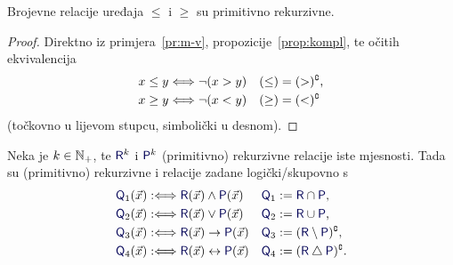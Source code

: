 \begin{korolar}\label{kor:mj-vj}
Brojevne relacije uređaja $\le$ i $\ge$ su primitivno rekurzivne.
\end{korolar}
\begin{proof}
Direktno iz primjera~\ref{pr:m-v}, propozicije~\ref{prop:kompl}, te očitih ekvivalencija
\begin{align}
    x\le y&\Longleftrightarrow\lnot(x>y) & (\le) &= (>)\sp{{\scriptscriptstyle\complement}}\text,\\
    x\ge y&\Longleftrightarrow\lnot(x<y) & (\ge) &= (<)\sp{{\scriptscriptstyle\complement}}
\end{align}
(točkovno u lijevom stupcu, simbolički u desnom).
\end{proof}

\begin{propozicija}\label{prop:vezn}
Neka je $k\in{\mathbb N}_+$, te $\f R^k$ i $\f P^k$ (primitivno) rekurzivne relacije iste mjesnosti. Tada su (primitivno) rekurzivne i relacije zadane logički\slash skupovno s
\begin{align}
    \f Q_1(\vec x)&:\Longleftrightarrow\f R(\vec x)\land\f P(\vec x)
    &
    \f Q_1 &:=\f R \cap\f P\text,
    \\
    \f Q_2(\vec x)&:\Longleftrightarrow\f R(\vec x)\lor\f P(\vec x)
    &
    \f Q_2 &:=\f R \cup\f P\text,
    \\
    \f Q_3(\vec x)&:\Longleftrightarrow\f R(\vec x)\to\f P(\vec x)
    &
    \f Q_3 &:=(\f R\setminus\f P)\kompl\text,
    \\
    \f Q_4(\vec x)&:\Longleftrightarrow\f R(\vec x)\leftrightarrow\f P(\vec x)
    &
    \f Q_4 &:=(\f R\mathbin\triangle\f P)\kompl\text.
\end{align}
\end{propozicija}
